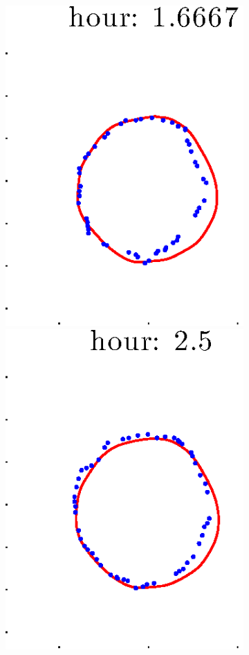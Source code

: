 \documentclass[12pt]{article}
\begin{document}
\begin{figure}[h!]
\begin{subfigure}[b]{.3\textwidth}
		\includegraphics[height=.15\textheight]{Pos14exp8/secondhalf/second3.eps}
		\includegraphics[height=.15\textheight]{Pos14exp8/secondhalf/second4.eps}

\end{subfigure}
\end{figure}
\end{document}
